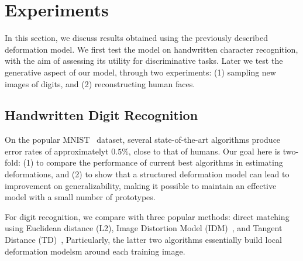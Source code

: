 \section{Experiments}
\label{sec:experiments}

In this section, we discuss results obtained using the previously described deformation model.
We first test the model on handwritten character recognition, with the
aim of assessing its utility for discriminative tasks. 
Later we test the generative aspect of our model, through two
experiments: (1) sampling new images of digits, and (2) reconstructing
human faces.


\subsection{Handwritten Digit Recognition}
On the popular MNIST~\cite{MNIST} dataset, several state-of-the-art
algorithms produce error rates of approximatelyt $0.5\%$,
close to that of humans.
Our goal here is two-fold:
(1) to compare the performance of current best algorithms in estimating
deformations, and
(2) to show that a structured deformation model can lead to
improvement on generalizability, making it possible to maintain an
effective model with a small number of prototypes.



For digit recognition, we compare with three popular methods:
direct matching using Euclidean distance (L2), Image Distortion Model
(IDM)~\cite{IDM}, and Tangent Distance (TD)~\cite{TD}, 
Particularly, the latter two algorithms essentially build local
deformation modelsm around each training image.

